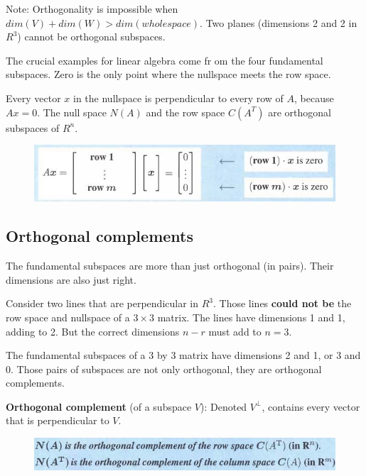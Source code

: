 \documentclass[10pt,a4paper]{article}
\begin{document}
Note: Orthogonality is impossible when $dim (V) + dim (W)  >  dim (whole space)$.  Two planes (dimensions 2 and 2 in $R^3$) cannot be orthogonal subspaces.

The crucial examples for  linear algebra come fr om the  four fundamental subspaces. Zero is the
only point where the nullspace meets the row space. 

\begin{tcolorbox}[breakable,colback=white]
    Every vector $x$ in the nullspace is perpendicular to every row of $A$, because $Ax  =  0$. 
    The null space $N(A)$ and the row space $C(A^T)$ are orthogonal subspaces of $R^n$.
\end{tcolorbox}
\begin{figure} [h!]
    \centering
    \includegraphics[scale=0.7]{oth.JPG}
\end{figure}

\subsection{Orthogonal complements}

The fundamental subspaces are more than just orthogonal (in  pairs). Their dimensions are also
just right. 

Consider two lines that are perpendicular in $R^3$. Those lines \textbf{could not be} the row
space and nullspace of a $3 \times 3$ matrix. The lines have dimensions 1 and 1, adding to 2.
But the correct dimensions $n - r$ must add to $n= 3$. 

The fundamental subspaces of a 3 by 3 matrix have dimensions 2 and 1, or 3 and 0. Those pairs of
subspaces are not only orthogonal, they are orthogonal complements.

\begin{tcolorbox}[breakable,colback=white]
\textbf{Orthogonal complement} (of a subspace $V$): Denoted $V^{\perp}$, contains every vector that is 
perpendicular to $V$.
\end{tcolorbox}
\begin{figure} [h!]
    \centering
    \includegraphics[scale=0.7]{com.JPG}
\end{figure}
\end{document}
